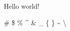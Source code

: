 \documentclass{article}
\begin{document}
Hello world!

\# \$ \% \^{} \& \_ \{ \} \~{} \textbackslash{}
\end{document}
